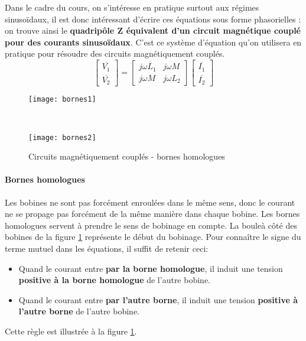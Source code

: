 Dans le cadre du cours, on s'intéresse en pratique surtout aux régimes sinusoïdaux, il est donc intéressant d'écrire ces équations sous forme phasorielles : on trouve ainsi le \textbf{quadripôle Z équivalent d'un circuit magnétique couplé pour des courants sinusoïdaux}. C'est ce système d'équation qu'on utilisera en pratique pour résoudre des circuits magnétiquement couplés.
\begin{equation}
\label{equaMagnet}
\begin{bmatrix} \overline{V_1} \\ \overline{V_2} \end{bmatrix} = \begin{bmatrix} j \omega L_1 & j \omega M \\ j \omega M & j \omega L_2 \end{bmatrix} \begin{bmatrix} \overline{I_1} \\ \overline{I_2} \end{bmatrix}
\end{equation}
\begin{figure}[H]
	\begin{minipage}[c]{.5\linewidth}
		\begin{center}
			\texttt{[image: bornes1]}
        \label{ltspice_plot_D}
		\end{center}
	\end{minipage}
	\vrule
	\
	\begin{minipage}[c]{.5\linewidth}
		\begin{center}
		    \texttt{[image: bornes2]}
        \label{labo_plot_D}
		\end{center}
	\end{minipage}
	\caption{Circuits magnétiquement couplés - bornes homologues}
    \label{bornes}
\end{figure}
\paragraph{Bornes homologues} Les bobines ne sont pas forcément enroulées dans le même sens, donc le courant ne se propage pas forcément de la même manière dans chaque bobine. Les bornes homologues servent à prendre le sens de bobinage en compte. La \og boule\fg à côté des bobines de la figure \ref{bornes} représente le début du bobinage. Pour connaître le signe du terme mutuel dans les équations, il suffit de retenir ceci: \begin{itemize}
\item Quand le courant entre \textbf{par la borne homologue}, il induit une tension \textbf{positive à la borne homologue} de l'autre bobine.
\item Quand le courant entre \textbf{par l'autre borne}, il induit une tension \textbf{positive à l'autre borne} de l'autre bobine.
\end{itemize}
Cette règle est illustrée à la figure \ref{bornes}.

